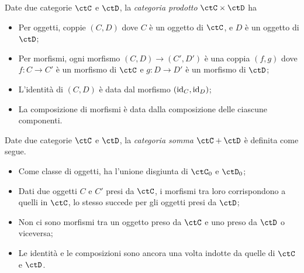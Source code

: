 \begin{definition}\label{def_cat_prodotto}
	Date due categorie \(\ctC\) e \(\ctD\), la \emph{categoria prodotto} \(\ctC\times\ctD\) ha
	\begin{itemize}
		\item Per oggetti, coppie \((C,D)\) dove \(C\) è un oggetto di \(\ctC\), e \(D\) è un oggetto di \(\ctD\);
		\item Per morfismi, ogni morfismo \((C,D)\to(C',D')\) è una coppia \((f,g)\) dove \(f:C\to C'\) è un morfismo di \(\ctC\) e \(g:D\to D'\) è un morfismo di \(\ctD\);
		\item L'identità di \((C,D)\) è data dal morfismo \((\mathrm{id}_C,\mathrm{id}_D)\);
		\item La composizione di morfismi è data dalla composizione delle ciascune componenti.
	\end{itemize}
\end{definition}
\begin{definition}\label{def_cat_somma}
	Date due categorie \(\ctC\) e \(\ctD\), la \emph{categoria somma} \(\ctC+\ctD\) è definita come segue.
	\begin{itemize}
		\item Come classe di oggetti,  ha l'unione disgiunta di \(\ctC_0\) e \(\ctD_0\);
		\item Dati due oggetti \(C\) e \(C'\) presi da \(\ctC\), i morfismi tra loro corrispondono a quelli in \(\ctC\), lo stesso succede per gli oggetti presi da \(\ctD\);
		\item Non ci sono morfismi tra un oggetto preso da \(\ctC\) e uno preso da \(\ctD\) o viceversa;
		\item Le identità e le composizioni sono ancora una volta indotte da quelle di \(\ctC\) e \(\ctD\).
	\end{itemize}
\end{definition}


